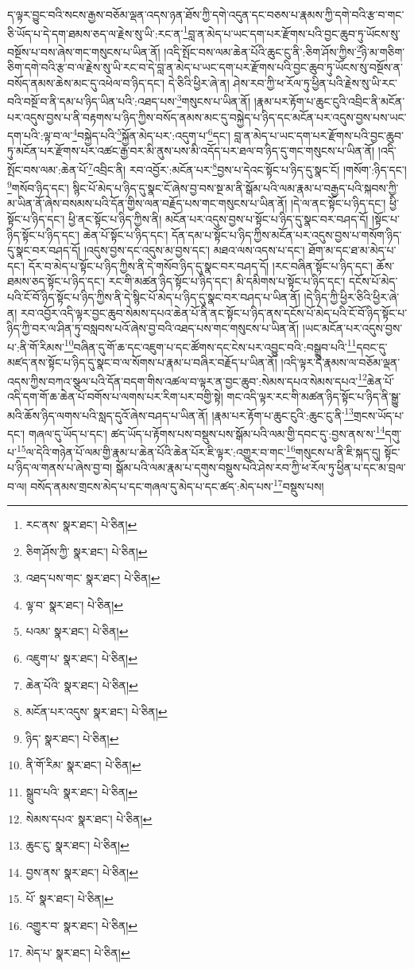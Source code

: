 ད་ལྟར་བྱུང་བའི་སངས་རྒྱས་བཅོམ་ལྡན་འདས་ཉན་ཐོས་ཀྱི་དགེ་འདུན་དང་བཅས་པ་རྣམས་ཀྱི་དགེ་བའི་རྩ་བ་གང་ཅི་ཡོད་པ་དེ་དག་ཐམས་ཅད་ལ་རྗེས་སུ་ཡི་:རང་ན་\footnote{རང་ནས་  སྣར་ཐང་།  པེ་ཅིན། }བླ་ན་མེད་པ་ཡང་དག་པར་རྫོགས་པའི་བྱང་ཆུབ་ཏུ་ཡོངས་སུ་བསྔོས་པ་བས་ཞེས་གང་གསུངས་པ་ཡིན་ནོ། །འདི་སྤོང་བས་ལམ་ཆེན་པོའི་ཆུང་ངུ་ནི་:ཅིག་ཤོས་ཀྱིས་\footnote{ཅིག་ཤོས་ཀྱི་  སྣར་ཐང་།  པེ་ཅིན། }ཉི་མ་གཅིག་ཅིག་དགེ་བའི་རྩ་བ་ལ་རྗེས་སུ་ཡི་རང་བ་དེ་བླ་ན་མེད་པ་ཡང་དག་པར་རྫོགས་པའི་བྱང་ཆུབ་ཏུ་ཡོངས་སུ་བསྔོས་ན་བསོད་ནམས་ཆེས་མང་དུ་འཕེལ་བ་ཉིད་དང་། དེ་ཅིའི་ཕྱིར་ཞེ་ན། ཤེས་རབ་ཀྱི་ཕ་རོལ་ཏུ་ཕྱིན་པའི་རྗེས་སུ་ཡི་རང་བའི་བསྔོ་བ་ནི་དམ་པ་ཉིད་ཡིན་པའི་:འཐད་པས་\footnote{འཐད་པས་གང་  སྣར་ཐང་།  པེ་ཅིན། }གསུངས་པ་ཡིན་ནོ། །རྣམ་པར་རྟོག་པ་ཆུང་ངུའི་འབྲིང་ནི་མངོན་པར་འདུས་བྱས་པ་ནི་བརྟགས་པ་ཉིད་ཀྱིས་བསོད་ནམས་མང་དུ་བསྐྱེད་པ་ཉིད་དང་མངོན་པར་འདུས་བྱས་པས་ཡང་དག་པའི་:ལྟ་བ་ལ་\footnote{ལྟ་བ་  སྣར་ཐང་།  པེ་ཅིན། }བསྐྱེད་པའི་\footnote{པའམ་  སྣར་ཐང་།  པེ་ཅིན། }སྐྱོན་མེད་པར་:འདུག་པ་\footnote{འཇུག་པ་  སྣར་ཐང་།  པེ་ཅིན། }དང་། བླ་ན་མེད་པ་ཡང་དག་པར་རྫོགས་པའི་བྱང་ཆུབ་ཏུ་མངོན་པར་རྫོགས་པར་འཚང་རྒྱ་བར་མི་ནུས་པས་མི་འདོད་པར་ཐལ་བ་ཉིད་དུ་གང་གསུངས་པ་ཡིན་ནོ། །འདི་སྤོང་བས་ལམ་:ཆེན་པོ་\footnote{ཆེན་པོའི་  སྣར་ཐང་།  པེ་ཅིན། }འབྲིང་ནི། རབ་འབྱོར་:མངོན་པར་\footnote{མངོན་པར་འདུས་  སྣར་ཐང་།  པེ་ཅིན། }བྱས་པ་དེའང་སྟོང་པ་ཉིད་དུ་སྣང་ངོ། །གསོག་:ཉིད་དང་། \footnote{ཉིད་  སྣར་ཐང་།  པེ་ཅིན། }གསོབ་ཉིད་དང་། སྙིང་པོ་མེད་པ་ཉིད་དུ་སྣང་ངོ་ཞེས་བྱ་བས་སྔ་མ་ནི་སྒོམ་པའི་ལམ་རྣམ་པ་བརྒྱད་པའི་སྐབས་ཀྱི་མ་ཡིན་ནོ་ཞེས་བསམས་པའི་དོན་གྱིས་ལན་བརྗོད་པས་གང་གསུངས་པ་ཡིན་ནོ། །དེ་ལ་ནང་སྟོང་པ་ཉིད་དང་། ཕྱི་སྟོང་པ་ཉིད་དང་། ཕྱི་ནང་སྟོང་པ་ཉིད་ཀྱིས་ནི། མངོན་པར་འདུས་བྱས་པ་སྟོང་པ་ཉིད་དུ་སྣང་བར་བཤད་དོ། །སྟོང་པ་ཉིད་སྟོང་པ་ཉིད་དང་། ཆེན་པོ་སྟོང་པ་ཉིད་དང་། དོན་དམ་པ་སྟོང་པ་ཉིད་ཀྱིས་མངོན་པར་འདུས་བྱས་པ་གསོག་ཉིད་དུ་སྣང་བར་བཤད་དོ། །འདུས་བྱས་དང་འདུས་མ་བྱས་དང་། མཐའ་ལས་འདས་པ་དང་། ཐོག་མ་དང་ཐ་མ་མེད་པ་དང་། དོར་བ་མེད་པ་སྟོང་པ་ཉིད་ཀྱིས་ནི་དེ་གསོབ་ཉིད་དུ་སྣང་བར་བཤད་དོ། །རང་བཞིན་སྟོང་པ་ཉིད་དང་། ཆོས་ཐམས་ཅད་སྟོང་པ་ཉིད་དང་། རང་གི་མཚན་ཉིད་སྟོང་པ་ཉིད་དང་། མི་དམིགས་པ་སྟོང་པ་ཉིད་དང་། དངོས་པོ་མེད་པའི་ངོ་བོ་ཉིད་སྟོང་པ་ཉིད་ཀྱིས་ནི་དེ་སྙིང་པོ་མེད་པ་ཉིད་དུ་སྣང་བར་བཤད་པ་ཡིན་ནོ། །དེ་ཉིད་ཀྱི་ཕྱིར་ཅིའི་ཕྱིར་ཞེ་ན། རབ་འབྱོར་འདི་ལྟར་བྱང་ཆུབ་སེམས་དཔའ་ཆེན་པོ་ནི་ནང་སྟོང་པ་ཉིད་ནས་དངོས་པོ་མེད་པའི་ངོ་བོ་ཉིད་སྟོང་པ་ཉིད་ཀྱི་བར་ལ་ཤིན་ཏུ་བསླབས་པའོ་ཞེས་བྱ་བའི་འཐད་པས་གང་གསུངས་པ་ཡིན་ནོ། །ཡང་མངོན་པར་འདུས་བྱས་པ་:ནི་གོ་རིམས་\footnote{ནི་གོ་རིམ་  སྣར་ཐང་།  པེ་ཅིན། }བཞིན་དུ་གོ་ཆ་དང་འཇུག་པ་དང་ཚོགས་དང་ངེས་པར་འབྱུང་བའི་:བསྒྲུབ་པའི་\footnote{སྒྲུབ་པའི་  སྣར་ཐང་།  པེ་ཅིན། }དབང་དུ་མཛད་ནས་སྟོང་པ་ཉིད་དུ་སྣང་བ་ལ་སོགས་པ་རྣམ་པ་བཞིར་བརྗོད་པ་ཡིན་ནོ། །འདི་ལྟར་དེ་རྣམས་ལ་བཅོམ་ལྡན་འདས་ཀྱིས་བཀའ་སྩལ་པའི་དོན་བདག་གིས་འཚལ་བ་ལྟར་ན་བྱང་ཆུབ་:སེམས་དཔའ་སེམས་དཔའ་\footnote{སེམས་དཔའ་  སྣར་ཐང་།  པེ་ཅིན། }ཆེན་པོ་འདི་དག་གོ་ཆ་ཆེན་པོ་བགོས་པ་ལགས་པར་རིག་པར་བགྱི་སྟེ། གང་འདི་ལྟར་རང་གི་མཚན་ཉིད་སྟོང་པ་ཉིད་ནི་སྒྱུ་མའི་ཆོས་ཉིད་ལགས་པའི་སླད་དུའོ་ཞེས་བཤད་པ་ཡིན་ནོ། །རྣམ་པར་རྟོག་པ་ཆུང་ངུའི་:ཆུང་ངུ་ནི་\footnote{ཆུང་ངུ་  སྣར་ཐང་།  པེ་ཅིན། }གྲངས་ཡོད་པ་དང་། གཞལ་དུ་ཡོད་པ་དང་། ཚད་ཡོད་པ་རྟོགས་པས་བསྡུས་པས་སྒོམ་པའི་ལམ་གྱི་དབང་དུ་:བྱས་ནས་ས་\footnote{བྱས་ནས་  སྣར་ཐང་།  པེ་ཅིན། }དགུ་པ་\footnote{པོ་  སྣར་ཐང་།  པེ་ཅིན། }ལ་དེའི་གཉེན་པོ་ལམ་གྱི་རྣམ་པ་ཆེན་པོའི་ཆེན་པོར་ཇི་ལྟར་:འགྱུར་བ་གང་\footnote{འགྱུར་བ་  སྣར་ཐང་།  པེ་ཅིན། }གསུངས་པ་ནི་ཇི་སྐད་དུ། སྟོང་པ་ཉིད་ལ་གནས་པ་ཞེས་བྱ་བ། སྒོམ་པའི་ལམ་རྣམ་པ་དགུས་བསྡུས་པའི་ཤེས་རབ་ཀྱི་ཕ་རོལ་ཏུ་ཕྱིན་པ་དང་མ་བྲལ་བ་ལ། བསོད་ནམས་གྲངས་མེད་པ་དང་གཞལ་དུ་མེད་པ་དང་ཚད་:མེད་པས་\footnote{མེད་པ་  སྣར་ཐང་།  པེ་ཅིན། }བསྡུས་པས། 
